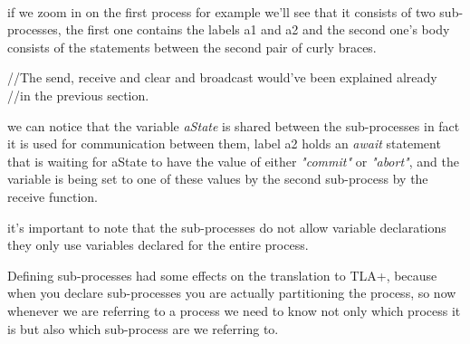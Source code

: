 \documentclass{thesul}
\begin{document}
\hfill\\

if we zoom in on the first process for example we'll see that it consists of two sub-processes, the first one contains the labels a1 and a2 and the second one's body consists of the statements between the second pair of curly braces.

//The send, receive and clear and broadcast would've been explained already //in the previous section.

we can notice that the variable \textit{aState} is shared between the sub-processes in fact it is used for communication between them, label a2 holds an \textit{await} statement that is waiting for aState to have the value of either \textit{"commit"} or \textit{"abort"}, and the variable is being set to one of these values by the second sub-process by the receive function.

it's important to note that the sub-processes do not allow variable declarations they only use variables declared for the entire process.

Defining sub-processes had some effects on the translation to TLA+, because when you declare sub-processes you are actually partitioning the process, so now whenever we are referring to a process we need to know not only which process it is but also which sub-process are we referring to.
 
\end{document}
